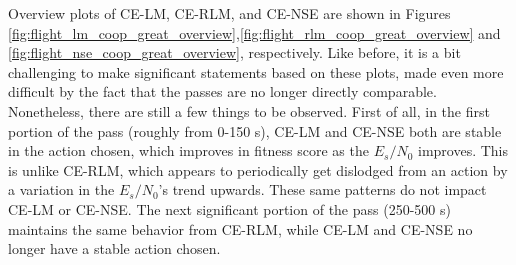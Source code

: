 \par Overview plots of CE-LM, CE-RLM, and CE-NSE are shown in Figures \ref{fig:flight_lm_coop_great_overview},\ref{fig:flight_rlm_coop_great_overview} and \ref{fig:flight_nse_coop_great_overview}, respectively. Like before, it is a bit challenging to make significant statements based on these plots, made even more difficult by the fact that the passes are no longer directly comparable. Nonetheless, there are still a few things to be observed. First of all, in the first portion of the pass (roughly from 0-150 s), CE-LM and CE-NSE both are stable in the action chosen, which improves in fitness score as the $E_s/N_0$ improves. This is unlike CE-RLM, which appears to periodically get dislodged from an action by a variation in the $E_s/N_0$'s trend upwards. These same patterns do not impact CE-LM or CE-NSE. The next significant portion of the pass (250-500 s) maintains the same behavior from CE-RLM, while CE-LM and CE-NSE no longer have a stable action chosen. 

